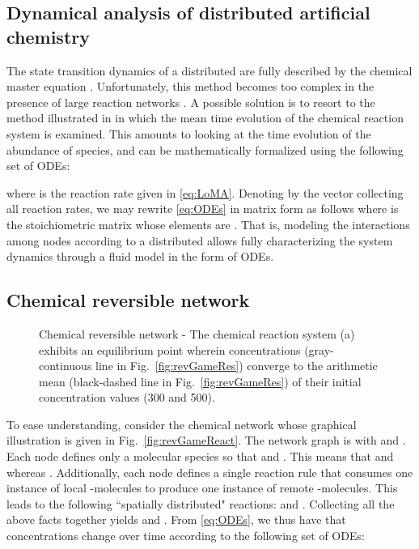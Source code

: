 \documentclass[journal]{IEEEtran}
\newcommand{\artChem}{}
\begin{document}
\subsection{Dynamical analysis of distributed artificial chemistry}

{The state transition dynamics of a distributed \artChem{} are fully described by the chemical
master equation \cite{Mc67}. Unfortunately, this method becomes too complex in the presence of large reaction networks \cite{JaHu07}. A possible solution is to resort to the method illustrated in \cite{Gi00} in which the mean time evolution of the chemical reaction system is examined. This amounts to looking at the time evolution of the abundance of species, and can be mathematically formalized using the following set of ODEs: 

where  is the reaction rate given in \eqref{eq:LoMA}. Denoting by  the vector collecting all reaction rates, we may rewrite \eqref{eq:ODEs} in matrix form as follows 
where  is the stoichiometric matrix whose elements are .
{That is, modeling the interactions among nodes according to a distributed \artChem{} allows fully characterizing the system dynamics through a fluid model in the form of ODEs.}
\subsection{Chemical reversible network}
\begin{figure}[t]
 \centering
\caption{{Chemical reversible network - The chemical reaction system (a) exhibits an equilibrium point wherein concentrations (gray-continuous line in Fig.~\ref{fig:revGameRes}) converge to the arithmetic mean (black-dashed line in Fig.~\ref{fig:revGameRes}) of their initial concentration values (300 and 500).}}
\label{fig:revGame}
\end{figure}
To ease understanding, consider the chemical {network} whose graphical illustration is given in Fig.~\ref{fig:revGameReact}. The network graph is  with  and . Each node  defines only a molecular species  so that  and . This means that  and  whereas . Additionally, each node defines a single reaction rule that consumes one instance of local -molecules to produce one instance of remote -molecules. {This leads to the following {``spatially distributed"} reactions:  and  }. Collecting all the above facts together yields  and . From \eqref{eq:ODEs}, we thus have that concentrations change over time according to the following set of ODEs:

}
\end{document}
